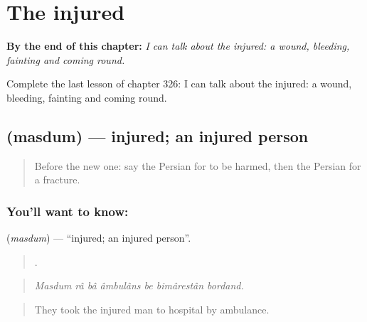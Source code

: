 
\chapter{The injured}
\label{ch:fa-the-injured}

\begin{chapteropening}
\textbf{By the end of this chapter:} \emph{I can talk about the injured: a wound, bleeding, fainting and coming round.}

Complete the last lesson of chapter 326: I can talk about the injured: a wound, bleeding, fainting and coming round.
\end{chapteropening}

\section[\texorpdfstring{\fa{مصدوم} (masdum)}{مصدوم (masdum)}]{ (masdum) — injured; an injured person}

\label{lesson:FA-C326-masdum}



\begin{quote}
Before the new one: say the Persian for to be harmed, then the Persian for a fracture.
\end{quote}

\subsection*{You'll want to know: }
\textbf{} (\emph{masdum}) — \textquotedblleft{}injured; an injured person\textquotedblright{}.

\begin{quote}
      .
\end{quote}

\begin{quote}
\emph{Masdum râ bâ âmbulâns be bimârestân bordand.}
\end{quote}

\begin{quote}
They took the injured man to hospital by ambulance.
\end{quote}

